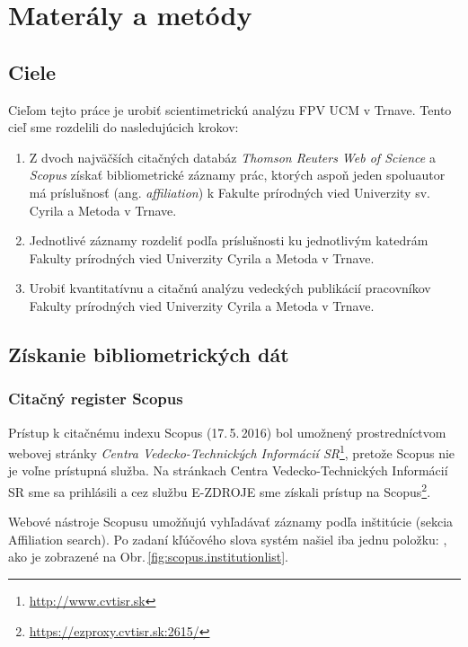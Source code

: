\chapter{Materály a metódy}

\section{Ciele}

Cieľom tejto práce je urobiť scientimetrickú analýzu FPV UCM v Trnave.  Tento
cieľ sme rozdelili do nasledujúcich krokov:

\begin{enumerate}

\item Z dvoch najväčších citačných databáz \emph{Thomson Reuters Web of Science}
  a \emph{Scopus} získať bibliometrické záznamy prác, ktorých aspoň jeden
  spoluautor má príslušnosť (ang. \emph{affiliation}) k Fakulte prírodných vied
  Univerzity sv. Cyrila a Metoda v Trnave.

\item Jednotlivé záznamy rozdeliť podľa príslušnosti ku jednotlivým katedrám
  Fakulty prírodných vied Univerzity Cyrila a Metoda v Trnave.

\item Urobiť kvantitatívnu a citačnú analýzu vedeckých publikácií pracovníkov
  Fakulty prírodných vied Univerzity Cyrila a Metoda v Trnave.

\end{enumerate}


\section{Získanie bibliometrických dát}

\subsection{Citačný register Scopus}

Prístup k citačnému indexu Scopus (17.\,5.\,2016) bol umožnený prostredníctvom
webovej stránky \emph{Centra Vedecko-Technických Informácií
  SR}\footnote{\url{http://www.cvtisr.sk}}, pretože Scopus nie je voľne
prístupná služba.  Na stránkach Centra Vedecko-Technických Informácií SR sme sa
prihlásili a cez službu E-ZDROJE sme získali prístup na
Scopus\footnote{\url{https://ezproxy.cvtisr.sk:2615/}}.

Webové nástroje Scopusu umožňujú vyhľadávať záznamy podľa inštitúcie (sekcia
Affiliation search). Po zadaní kľúčového slova  systém našiel iba
jednu položku: , ako je
zobrazené na Obr.\,\ref{fig:scopus.institutionlist}.

